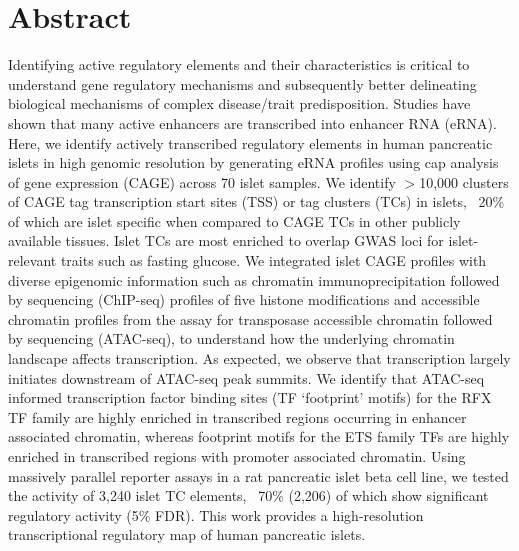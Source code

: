 ﻿\section{Abstract}
Identifying active regulatory elements and their characteristics is critical to understand gene regulatory mechanisms and subsequently better delineating biological mechanisms of complex disease/trait predisposition. Studies have shown that many active enhancers are transcribed into enhancer RNA (eRNA). Here, we identify actively transcribed regulatory elements in human pancreatic islets in high genomic resolution by generating eRNA profiles using cap analysis of gene expression (CAGE) across 70 islet samples. We identify $>$10,000 clusters of CAGE tag transcription start sites (TSS) or tag clusters (TCs) in islets, ~20\% of which are islet specific when compared to CAGE TCs in other publicly available tissues. Islet TCs are most enriched to overlap GWAS loci for islet-relevant traits such as fasting glucose. We integrated islet CAGE profiles with diverse epigenomic information such as chromatin immunoprecipitation followed by sequencing (ChIP-seq) profiles of five histone modifications and accessible chromatin profiles from the assay for transposase accessible chromatin followed by sequencing (ATAC-seq), to understand how the underlying chromatin landscape affects transcription. As expected, we observe that transcription largely initiates downstream of ATAC-seq peak summits. We identify that ATAC-seq informed transcription factor binding sites (TF ‘footprint’ motifs) for the RFX TF family are highly enriched in transcribed regions occurring in enhancer associated chromatin, whereas footprint motifs for the ETS family TFs are highly enriched in transcribed regions with promoter associated chromatin. Using massively parallel reporter assays in a rat pancreatic islet beta cell line, we tested the activity of 3,240 islet TC elements, ~70\% (2,206) of which show significant regulatory activity (5\% FDR). This work provides a high-resolution transcriptional regulatory map of human pancreatic islets.


